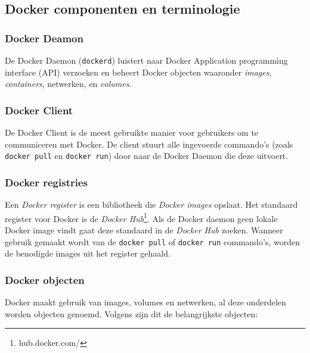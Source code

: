 \subsection{Docker componenten en terminologie}

\subsubsection{Docker Deamon}De Docker Daemon (\verb|dockerd|) luistert naar Docker Application programming interface (API) verzoeken en beheert Docker objecten waaronder \textit{images}, \textit{containers}, netwerken, en \textit{volumes}.

\subsubsection{Docker Client}De Docker Client is de meest gebruikte manier voor gebruikers om te communiceren met Docker. De client stuurt alle ingevoerde commando's (zoals \verb|docker pull| en \verb|docker run|) door naar de Docker Daemon die deze uitvoert.

\subsubsection{Docker registries} \label{registry}
Een \textit{Docker register} is een bibliotheek die \textit{Docker images} opslaat. Het standaard register voor Docker is de \textit{Docker Hub}\footnote{hub.docker.com/}. Als de Docker daemon geen lokale Docker image vindt gaat deze standaard in de \textit{Docker Hub} zoeken. Wanneer gebruik gemaakt wordt van de \verb|docker pull| of \verb|docker run| commando's, worden de benodigde images uit het register gehaald.

\subsubsection{Docker objecten} \label{dockerObjects}
Docker maakt gebruik van images, volumes en netwerken, al deze onderdelen worden objecten genoemd. Volgens \textcite{Docker2021a} zijn dit de belangrijkste objecten:

